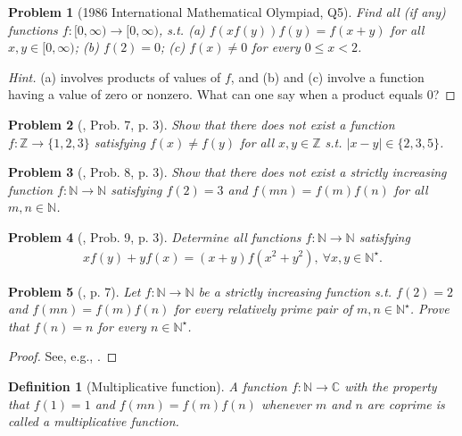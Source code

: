 \documentclass[oneside]{book}
\numberwithin{equation}{section}
\newtheorem{definition}{Definition}[section]
\newtheorem{problem}{Problem}[section]
\begin{document}
\begin{problem}[1986 International Mathematical Olympiad, Q5]
	Find all (if any) functions $f:[0,\infty)\to[0,\infty)$, s.t. (a) $f(xf(y))f(y) = f(x + y)$ for all $x,y\in[0,\infty)$; (b) $f(2) = 0$; (c) $f(x)\ne 0$ for every $0\le x < 2$.
\end{problem}

\begin{proof}[Hint]
	(a) involves products of values of $f$, and (b) and (c) involve a function having a value of zero or nonzero. What can one say when a product equals 0?
\end{proof}

\begin{problem}[\cite{Gelca_Andreescu2017}, Prob. 7, p. 3]
	Show that there does not exist a function $f:\mathbb{Z}\to\{1,2,3\}$ satisfying $f(x)\ne f(y)$ for all $x,y\in\mathbb{Z}$ s.t. $|x - y|\in\{2,3,5\}$.
\end{problem}

\begin{problem}[\cite{Gelca_Andreescu2017}, Prob. 8, p. 3]
	Show that there does not exist a strictly increasing function $f:\mathbb{N}\to\mathbb{N}$ satisfying $f(2) = 3$ and $f(mn) = f(m)f(n)$ for all $m,n\in\mathbb{N}$.
\end{problem}

\begin{problem}[\cite{Gelca_Andreescu2017}, Prob. 9, p. 3]
	Determine all functions $f:\mathbb{N}\to\mathbb{N}$ satisfying
	\begin{align*}
		xf(y) + yf(x) = (x + y)f(x^2 + y^2),\ \forall x,y\in\mathbb{N}^\star.
	\end{align*}
\end{problem}

\begin{problem}[\cite{Gelca_Andreescu2017}, p. 7]
	Let $f:\mathbb{N}\to\mathbb{N}$ be a strictly increasing function s.t. $f(2) = 2$ and $f(mn) = f(m)f(n)$ for every relatively prime pair of $m,n\in\mathbb{N}^\star$. Prove that $f(n) = n$ for every $n\in\mathbb{N}^\star$.
\end{problem}

\begin{proof}[Proof]
	See, e.g., \cite[p. 8]{Gelca_Andreescu2017}.
\end{proof}

\begin{definition}[Multiplicative function]
	A function $f:\mathbb{N}\to\mathbb{C}$ with the property that $f(1) = 1$ and $f(mn) = f(m)f(n)$ whenever $m$ and $n$ are coprime is called a \emph{multiplicative function}.
\end{definition}
\end{document}
